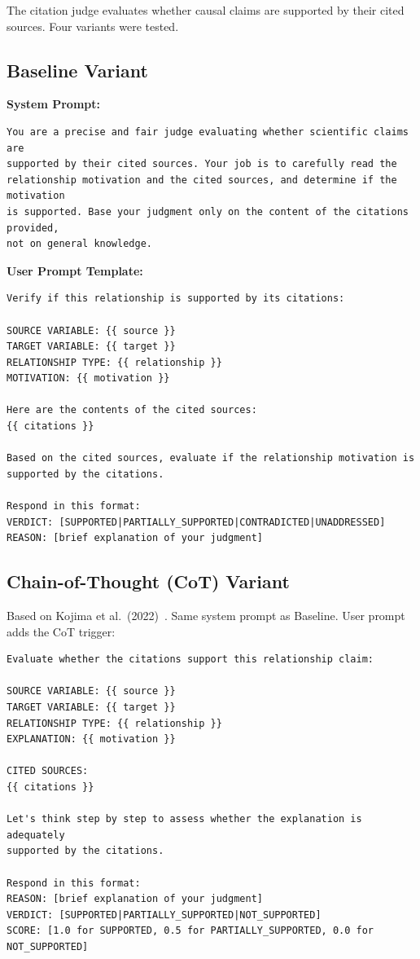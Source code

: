 The citation judge evaluates whether causal claims are supported by their cited sources. Four variants were tested.

\subsection{Baseline Variant}
\label{sec:prompt_citation_baseline}

\noindent\textbf{System Prompt:}
\begin{small}
\begin{verbatim}
You are a precise and fair judge evaluating whether scientific claims are
supported by their cited sources. Your job is to carefully read the
relationship motivation and the cited sources, and determine if the motivation
is supported. Base your judgment only on the content of the citations provided,
not on general knowledge.
\end{verbatim}
\end{small}

\noindent\textbf{User Prompt Template:}
\begin{small}
\begin{verbatim}
Verify if this relationship is supported by its citations:

SOURCE VARIABLE: {{ source }}
TARGET VARIABLE: {{ target }}
RELATIONSHIP TYPE: {{ relationship }}
MOTIVATION: {{ motivation }}

Here are the contents of the cited sources:
{{ citations }}

Based on the cited sources, evaluate if the relationship motivation is
supported by the citations.

Respond in this format:
VERDICT: [SUPPORTED|PARTIALLY_SUPPORTED|CONTRADICTED|UNADDRESSED]
REASON: [brief explanation of your judgment]
\end{verbatim}
\end{small}

\subsection{Chain-of-Thought (CoT) Variant}
\label{sec:prompt_citation_cot}

Based on Kojima et al.\ (2022)~\cite{kojima2022large}. Same system prompt as Baseline. User prompt adds the CoT trigger:

\begin{small}
\begin{verbatim}
Evaluate whether the citations support this relationship claim:

SOURCE VARIABLE: {{ source }}
TARGET VARIABLE: {{ target }}
RELATIONSHIP TYPE: {{ relationship }}
EXPLANATION: {{ motivation }}

CITED SOURCES:
{{ citations }}

Let's think step by step to assess whether the explanation is adequately
supported by the citations.

Respond in this format:
REASON: [brief explanation of your judgment]
VERDICT: [SUPPORTED|PARTIALLY_SUPPORTED|NOT_SUPPORTED]
SCORE: [1.0 for SUPPORTED, 0.5 for PARTIALLY_SUPPORTED, 0.0 for NOT_SUPPORTED]
\end{verbatim}
\end{small}

